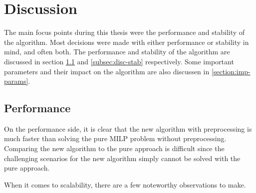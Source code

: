 \chapter{Discussion}
\label{section:discussion}
The main focus points during this thesis were the performance and stability of the algorithm. Most decisions were made with either performance or stability in mind, and often both. The performance and stability of the algorithm are discussed in section \ref{subsec:disc-perf} and \ref{subsec:disc-stab} respectively. Some important parameters and their impact on the algorithm are also discussen in \ref{section:imp-params}.
\section{Performance}
\label{subsec:disc-perf}
On the performance side, it is clear that the new algorithm with preprocessing is much faster than solving the pure MILP problem without preprocessing. Comparing the new algorithm to the pure approach is difficult since the challenging scenarios for the new algorithm simply cannot be solved with the pure approach.
\par
When it comes to scalability, there are a few noteworthy observations to make. 
